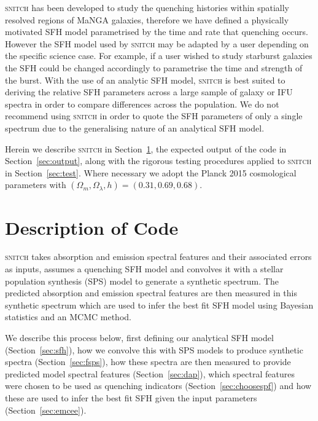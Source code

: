 \documentclass[useAMS,usenatbib]{mn2e}
\begin{document}
\textsc{snitch} has been developed to study the quenching histories within spatially resolved regions of MaNGA galaxies, therefore we have defined a physically motivated SFH model parametrised by the time and rate that quenching occurs. However the SFH model used by \textsc{snitch} may be adapted by a user depending on the specific science case. For example, if a user wished to study starburst galaxies the SFH could be changed accordingly to parametrise the time and strength of the burst. With the use of an analytic SFH model, \textsc{snitch} is best suited to deriving the relative SFH parameters across a large sample of galaxy or IFU spectra in order to compare differences across the population. We do not recommend using \textsc{snitch} in order to quote the SFH parameters of only a single spectrum due to the generalising nature of an analytical SFH model.  



Herein we describe \textsc{snitch} in Section~\ref{sec:code}, the expected output of the code in Section~\ref{sec:output}, along with the rigorous testing procedures applied to \textsc{snitch} in Section~\ref{sec:test}. Where necessary we adopt the Planck 2015 \citep{planck16} cosmological parameters with $(\Omega_m, \Omega_{\lambda}, h) = (0.31, 0.69, 0.68)$. 

\section{Description of Code}\label{sec:code}

\textsc{snitch} takes absorption and emission spectral features and their associated errors as inputs, assumes a quenching SFH model and convolves it with a stellar population synthesis (SPS) model to generate a synthetic spectrum. The predicted absorption and emission spectral features are then measured in this synthetic spectrum which are used to infer the best fit SFH model using Bayesian statistics and an MCMC method. 

We describe this process below, first defining our analytical SFH model (Section~\ref{sec:sfh}), how we convolve this with SPS models to produce synthetic spectra (Section~\ref{sec:fsps}), how these spectra are then measured to provide predicted model spectral features (Section~\ref{sec:dap}), which spectral features were chosen to be used as quenching indicators (Section~\ref{sec:choosespf}) and how these are used to infer the best fit SFH given the input parameters (Section~\ref{sec:emcee}). 
\end{document}
